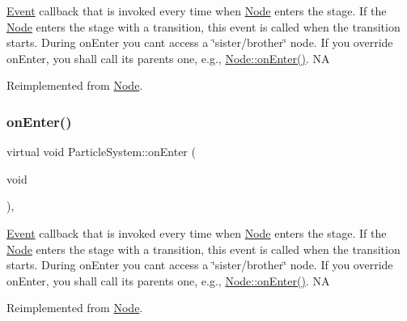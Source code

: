 \hyperlink{classEvent}{Event} callback that is invoked every time when \hyperlink{classNode}{Node} enters the \textquotesingle{}stage\textquotesingle{}. If the \hyperlink{classNode}{Node} enters the \textquotesingle{}stage\textquotesingle{} with a transition, this event is called when the transition starts. During on\+Enter you can\textquotesingle{}t access a \char`\"{}sister/brother\char`\"{} node. If you override on\+Enter, you shall call its parent\textquotesingle{}s one, e.\+g., \hyperlink{classNode_a7f51764c4afd5018a052b9ef71c03374}{Node\+::on\+Enter()}.  NA 

Reimplemented from \hyperlink{classNode_a7f51764c4afd5018a052b9ef71c03374}{Node}.

\mbox{\label{classParticleSystem_a8bd3174194f57eb26d0e1348c1067e75}} 
\subsubsection{\texorpdfstring{on\+Enter()}{onEnter()}\hspace{0.1cm}{\footnotesize\ttfamily [2/2]}}
{\footnotesize\ttfamily virtual void Particle\+System\+::on\+Enter (\begin{DoxyParamCaption}\item[{void}]{ }\end{DoxyParamCaption})\hspace{0.3cm}{\ttfamily [override]}, {\ttfamily [virtual]}}

\hyperlink{classEvent}{Event} callback that is invoked every time when \hyperlink{classNode}{Node} enters the \textquotesingle{}stage\textquotesingle{}. If the \hyperlink{classNode}{Node} enters the \textquotesingle{}stage\textquotesingle{} with a transition, this event is called when the transition starts. During on\+Enter you can\textquotesingle{}t access a \char`\"{}sister/brother\char`\"{} node. If you override on\+Enter, you shall call its parent\textquotesingle{}s one, e.\+g., \hyperlink{classNode_a7f51764c4afd5018a052b9ef71c03374}{Node\+::on\+Enter()}.  NA 

Reimplemented from \hyperlink{classNode_a7f51764c4afd5018a052b9ef71c03374}{Node}.

\mbox{\label{classParticleSystem_ad4eb9130a81ad207669531f165ed6de8}} 
